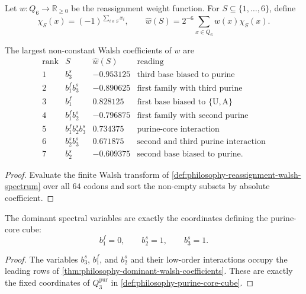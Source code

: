 \begin{definition}
\label{def:philosophy-reassignment-walsh-spectrum}
Let $w:Q_{6}\to\mathbb{R}_{\ge 0}$ be the reassignment weight function.
For $S\subseteq\{1,\ldots,6\}$, define
$$
  \chi_{S}(x)=(-1)^{\sum_{i\in S}x_{i}},
  \qquad
  \widehat{w}(S)=2^{-6}\sum_{x\in Q_{6}}w(x)\chi_{S}(x).
$$
\end{definition}

\begin{theorem}
\label{thm:philosophy-dominant-walsh-coefficients}
The largest non-constant Walsh coefficients of $w$ are
$$
\begin{array}{c|c|r|l}
  \text{rank} & S & \widehat{w}(S) & \text{reading}\\
\hline
  1 & b_{3}^{s} & -0.953125 & \text{third base biased to purine}\\
  2 & b_{1}^{f}b_{3}^{s} & -0.890625
    & \text{first family with third purine}\\
  3 & b_{1}^{f} & 0.828125 & \text{first base biased to }\{\mathrm{U},\mathrm{A}\}\\
  4 & b_{1}^{f}b_{2}^{s} & -0.796875
    & \text{first family with second purine}\\
  5 & b_{1}^{f}b_{2}^{s}b_{3}^{s} & 0.734375
    & \text{purine-core interaction}\\
  6 & b_{2}^{s}b_{3}^{s} & 0.671875
    & \text{second and third purine interaction}\\
  7 & b_{2}^{s} & -0.609375 & \text{second base biased to purine}.
\end{array}
$$
\end{theorem}
\begin{proof}
Evaluate the finite Walsh transform of
\autoref{def:philosophy-reassignment-walsh-spectrum} over all $64$
codons and sort the non-empty subsets by absolute coefficient.
\end{proof}

\begin{corollary}
\label{cor:philosophy-walsh-recovers-purine-core-variables}
The dominant spectral variables are exactly the coordinates defining
the purine-core cube:
$$
  b_{1}^{f}=0,\qquad b_{2}^{s}=1,\qquad b_{3}^{s}=1.
$$
\end{corollary}
\begin{proof}
The variables $b_{3}^{s}$, $b_{1}^{f}$, and $b_{2}^{s}$ and their
low-order interactions occupy the leading rows of
\autoref{thm:philosophy-dominant-walsh-coefficients}. These are exactly
the fixed coordinates of $Q_{3}^{\mathrm{pur}}$ in
\autoref{def:philosophy-purine-core-cube}.
\end{proof}

